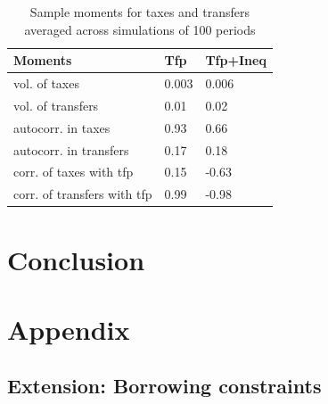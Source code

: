 \documentclass[thmsb,11pt]{article}
\begin{document}
\begin{table}[htp]

\begin{tabular}{|l|l|l|}
\hline
Moments &Tfp& Tfp+Ineq\\\hline
vol. of taxes & 0.003&0.006\\
vol. of transfers &0.01 &0.02\\
autocorr. in taxes& 0.93&0.66\\
autocorr. in transfers& 0.17&0.18\\
corr. of taxes with tfp &0.15 &-0.63\\
corr. of transfers with tfp & 0.99&-0.98\\ \hline
\end{tabular}
\caption{Sample moments for taxes and transfers averaged across simulations of 100 periods}
\label{tab:sample moments}
\end{table}




\section{Conclusion}\label{sec:concluding}
\appendix
\section{Appendix}

\subsection{Extension: Borrowing constraints}
\label{appndx: credit limits and RE}
%
\end{document}
